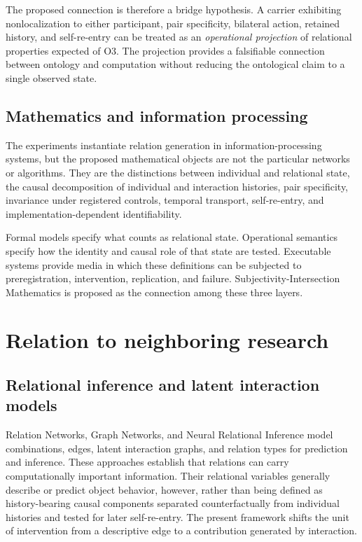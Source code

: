 \documentclass[11pt,a4paper]{article}
\begin{document}
The proposed connection is therefore a bridge hypothesis. A carrier exhibiting nonlocalization to either participant, pair specificity, bilateral action, retained history, and self-re-entry can be treated as an \emph{operational projection} of relational properties expected of O3. The projection provides a falsifiable connection between ontology and computation without reducing the ontological claim to a single observed state.

\subsection{Mathematics and information processing}

The experiments instantiate relation generation in information-processing systems, but the proposed mathematical objects are not the particular networks or algorithms. They are the distinctions between individual and relational state, the causal decomposition of individual and interaction histories, pair specificity, invariance under registered controls, temporal transport, self-re-entry, and implementation-dependent identifiability.

Formal models specify what counts as relational state. Operational semantics specify how the identity and causal role of that state are tested. Executable systems provide media in which these definitions can be subjected to preregistration, intervention, replication, and failure. Subjectivity-Intersection Mathematics is proposed as the connection among these three layers.

\section{Relation to neighboring research}

\subsection{Relational inference and latent interaction models}

Relation Networks, Graph Networks, and Neural Relational Inference model combinations, edges, latent interaction graphs, and relation types for prediction and inference. These approaches establish that relations can carry computationally important information. Their relational variables generally describe or predict object behavior, however, rather than being defined as history-bearing causal components separated counterfactually from individual histories and tested for later self-re-entry. The present framework shifts the unit of intervention from a descriptive edge to a contribution generated by interaction.
\end{document}
